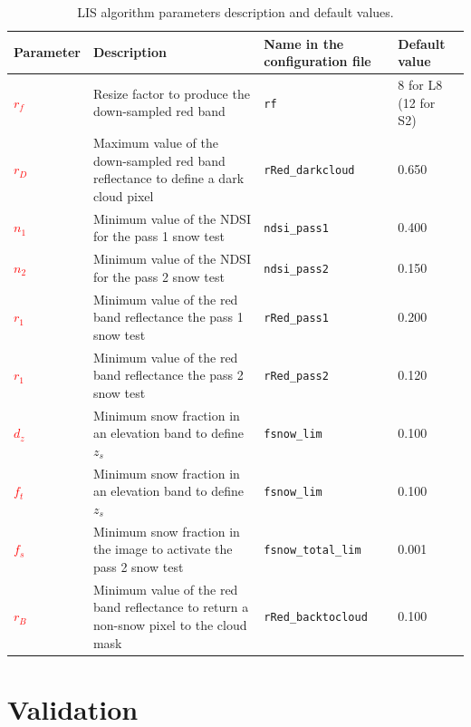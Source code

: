 \documentclass[a4paper]{article}
\begin{document}
\begin{table}
\begin{center}
\begin{tabularx}{\textwidth}{|l X l l|}
\hline
Parameter & Description & Name in the configuration file & Default value\\
\hline
\textcolor{red}{$r_f$} & Resize factor to produce the down-sampled red band & \texttt{rf} & 8 for L8 (12 for S2) \\
\textcolor{red}{$r_D$} & Maximum value of the down-sampled red band reflectance to define a dark cloud pixel & \texttt{rRed\_darkcloud} & 0.650 \\
\textcolor{red}{$n_1$} & Minimum value of the NDSI for the pass 1 snow test & \texttt{ndsi\_pass1} & 0.400\\
\textcolor{red}{$n_2$} & Minimum value of the NDSI for the pass 2 snow test & \texttt{ndsi\_pass2} & 0.150\\
\textcolor{red}{$r_1$} & Minimum value of the red band reflectance the pass 1 snow test  & \texttt{rRed\_pass1} & 0.200 \\
\textcolor{red}{$r_1$} & Minimum value of the red band reflectance the pass 2 snow test  & \texttt{rRed\_pass2} & 0.120 \\
\textcolor{red}{$d_z$} & Minimum snow fraction in an elevation band to define $z_s$ & \texttt{fsnow\_lim} & 0.100 \\
\textcolor{red}{$f_t$} & Minimum snow fraction in an elevation band to define $z_s$ & \texttt{fsnow\_lim} & 0.100 \\
\textcolor{red}{$f_s$} & Minimum snow fraction in the image to activate the pass 2 snow test & \texttt{fsnow\_total\_lim} & 0.001 \\
\textcolor{red}{$r_B$} & Minimum value of the red band reflectance to return a non-snow pixel to the cloud mask & \texttt{rRed\_backtocloud} & 0.100 \\
\hline
\end{tabularx}
\end{center}
\caption{LIS algorithm parameters description and default values.}
\end{table}\label{tab:param}



\section{Validation}\label{par:validation}
\end{document}

